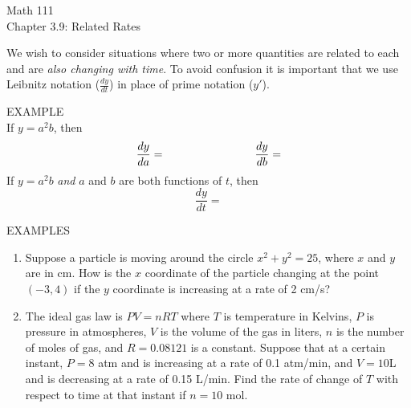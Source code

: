 \documentclass[11pt]{article}
\begin{document}
\begin{center}
\Large
\rm{Math 111}
\\
\rm{Chapter 3.9:  Related Rates}
\\
\end{center}
\vspace{0.2in}

We wish to consider situations where two or more quantities are related to each and are \emph{also changing with time}.
To avoid confusion it is important that we use Leibnitz notation ($\frac{dy}{dt}$) in place of prime notation ($y'$).

\vspace{0.1in}

EXAMPLE \\
If $y=a^2b$, then
\begin{displaymath}
\frac{dy}{da} = \hspace{1.1in} \frac{dy}{db} = 
\end{displaymath} 
If $y=a^2b$ \emph{and} $a$ and $b$ are both functions of $t$, then
\begin{displaymath}
\frac{dy}{dt} =
\end{displaymath} 

\vspace{.3in}

EXAMPLES \\

\begin{enumerate}
\item{Suppose a particle is moving around the circle $x^2 + y^2 = 25$, where $x$ and $y$ are in cm.  How is the $x$ coordinate of the particle
changing at the point $(-3,4)$ if the $y$ coordinate is increasing at a rate of 2 cm/s?
}
  
\vspace{1.5in}
\item{The ideal gas law is $PV=nRT$ where $T$ is temperature in Kelvins, $P$ is pressure in atmospheres, $V$ is the volume of the gas in liters, $n$ is the  number of moles of gas, and $R=0.08121$ is a constant.  Suppose that at a certain instant, $P=8$ atm and is increasing at a rate of 0.1 atm/min,
  and $V=10$L and is decreasing at a rate of 0.15 L/min.  Find the rate of change of $T$ with respect to time at that instant if $n=10$ mol.

  }

\end{enumerate}


\pagebreak
\end{document}
